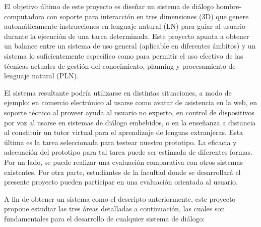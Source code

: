 
El objetivo \'ultimo de este proyecto es dise\~nar un sistema de di\'alogo
hombre-computadora con soporte para interacci\'on en tres dimensiones (3D) que
genere autom\'aticamente instrucciones en lenguaje natural (LN) para guiar  al
usuario durante la ejecuci\'on de una tarea determinada. Este proyecto apunta
a obtener un balance entre un sistema de uso general (aplicable en
diferentes \'ambitos) y un sistema lo suficientemente espec\'ifico
como para permitir el uso efectivo de las t\'ecnicas actuales de
gesti\'on del conocimiento, planning y procesamiento de lenguaje
natural (PLN).

El sistema resultante podr\'ia utilizarse en distintas situaciones, a modo de
ejemplo:
en comercio electr\'onico  al usarse como avatar de asistencia en la web, en
soporte t\'ecnico al proveer ayuda al usuario no experto, en
control de dispositivos por voz al usarse en sistemas de di\'alogo embebidos, o
en la ense\~nanza a distancia al constituir un tutor virtual para el aprendizaje
de lenguas extranjeras. Esta \'ultima es la tarea seleccionada para testear
nuestro prototipo. La eficacia y adecuaci\'on del prototipo para
tal tarea puede ser estimada de diferentes formas. Por un lado, se puede realizar 
una evaluaci\'on comparativa con
otros sistemas existentes. Por otra parte, estudiantes de la facultad donde se desarrollar\'a
el presente proyecto pueden participar en una evaluaci\'on orientada al usuario.


A fin de obtener un sistema como el descripto anteriormente, este proyecto
propone estudiar las tres \'areas detalladas a continuaci\'on, las cuales son 
fundamentales para el desarrollo de cualquier sistema de di\'alogo:

